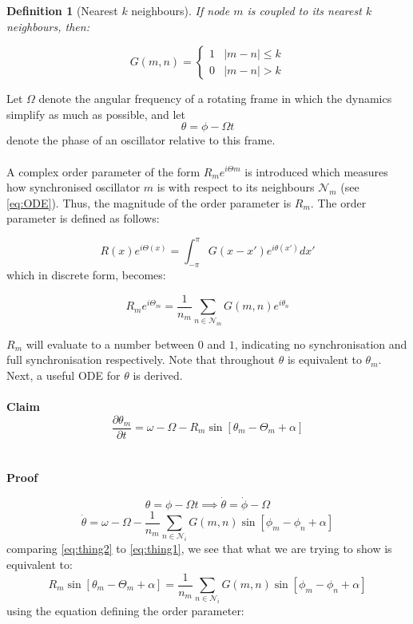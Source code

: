 \documentclass{article}
\newtheorem{dfn}{Definition}[section]
\begin{document}
\begin{dfn}[Nearest $k$ neighbours]
If node $m$ is coupled to its nearest $k$ neighbours, then:

$$G(m,n) = \begin{cases} 
      1 & |m-n|\leq k \\
      0 & |m-n| > k 
   \end{cases} $$
\end{dfn}
\noindent
Let $\Omega$ denote the angular frequency of a rotating frame in which the dynamics simplify as much as possible, and let
$$\theta = \phi - \Omega t$$
denote the phase of an oscillator relative to this frame.
\\
\\
A complex order parameter of the form $R_me^{i\Theta m}$ is introduced which measures how synchronised oscillator $m$ is with respect to its neighbours $\mathcal{N}_m$ (see \ref{eq:ODE}). Thus, the magnitude of the order parameter is $R_m$. The order parameter is defined as follows:

\begin{equation}
R(x)e^{i\Theta(x)} = \int_{-\pi}^{\pi}G(x-x')e^{i\theta(x')}dx'
\end{equation}
which in discrete form, becomes:

\begin{equation}
\label{eq:order_param}
R_me^{i\Theta_m} = \frac{1}{n_m}\sum\limits_{n\in{\mathcal{N}_m}}^{} G(m,n) e^{i\theta_n}
\end{equation}

$R_m$ will evaluate to a number between $0$ and $1$, indicating no synchronisation and full synchronisation respectively. Note that throughout $\theta$ is equivalent to $\theta_m$. Next, a useful ODE for $\theta$ is derived.
\\
\\
\textbf{Claim}
\begin{equation}
\label{eq:thing1}
\frac{\partial \theta_m}{\partial t} = \omega - \Omega - R_m \sin[\theta_m - \Theta_m + \alpha]
\end{equation}
\\
\\
\textbf{Proof}

$$\theta = \phi - \Omega t \implies \dot{\theta} = \dot{\phi} - \Omega$$
\begin{equation}
\label{eq:thing2}
\dot{\theta} = \omega - \Omega - \frac{1}{n_m} \sum\limits_{n\in{\mathcal{N}_i}}^{} G(m,n)\sin[\phi_m - \phi_n + \alpha]
\end{equation}
comparing \ref{eq:thing2} to \ref{eq:thing1}, we see that what we are trying to show is equivalent to:
$$R_m \sin[\theta_m - \Theta_m + \alpha] = \frac{1}{n_m} \sum\limits_{n\in{\mathcal{N}_i}}^{} G(m,n)\sin[\phi_m - \phi_n + \alpha]$$
using the equation defining the order parameter:
\end{document}
